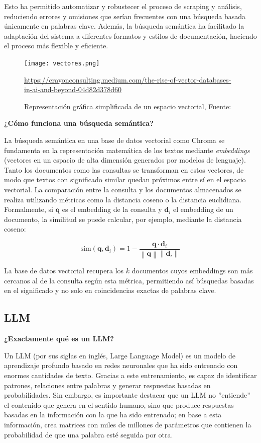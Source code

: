 \documentclass{article}
\begin{document}
Esto ha permitido automatizar y robustecer el proceso de scraping y análisis, reduciendo errores y omisiones que serían frecuentes con una búsqueda basada únicamente en palabras clave. Además, la búsqueda semántica ha facilitado la adaptación del sistema a diferentes formatos y estilos de documentación, haciendo el proceso más flexible y eficiente.

\begin{figure}[H] %
\centering
\texttt{[image: vectores.png]}
\caption{Representación gráfica simplificada de un espacio vectorial, Fuente:} 
\url{https://crayonconsulting.medium.com/the-rise-of-vector-databases-in-ai-and-beyond-04d82d378d60}
\label{tab:Vectores}
\end{figure}

\textbf{¿Cómo funciona una búsqueda semántica?}

La búsqueda semántica en una base de datos vectorial como Chroma se fundamenta en la representación matemática de los textos mediante \textit{embeddings} (vectores en un espacio de alta dimensión generados por modelos de lenguaje). Tanto los documentos como las consultas se transforman en estos vectores, de modo que textos con significado similar quedan próximos entre sí en el espacio vectorial. La comparación entre la consulta y los documentos almacenados se realiza utilizando métricas como la distancia coseno o la distancia euclidiana. Formalmente, si $\mathbf{q}$ es el embedding de la consulta y $\mathbf{d}_i$ el embedding de un documento, la similitud se puede calcular, por ejemplo, mediante la distancia coseno:

\begin{equation}
\text{sim}(\mathbf{q}, \mathbf{d}_i) = 1 - \frac{\mathbf{q} \cdot \mathbf{d}_i}{\left\| \mathbf{q} \right\| \left\| \mathbf{d}_i \right\|}
\end{equation}

La base de datos vectorial recupera los $k$ documentos cuyos embeddings son más cercanos al de la consulta según esta métrica, permitiendo así búsquedas basadas en el significado y no solo en coincidencias exactas de palabras clave.

\subsection{LLM} \label{LLM} 

\textbf{¿Exactamente qué es un LLM?} 

Un LLM (por sus siglas en inglés, Large Language Model) es un modelo de aprendizaje profundo basado en redes neuronales que ha sido entrenado con enormes cantidades de texto. Gracias a este entrenamiento, es capaz de identificar patrones, relaciones entre palabras y generar respuestas basadas en probabilidades. Sin embargo, es importante destacar que un LLM no ''entiende'' el contenido que genera en el sentido humano, sino que produce respuestas basadas en la información con la que ha sido entrenado; en base a esta información, crea matrices con miles de millones de parámetros que contienen la probabilidad de que una palabra esté seguida por otra. \\
\end{document}

